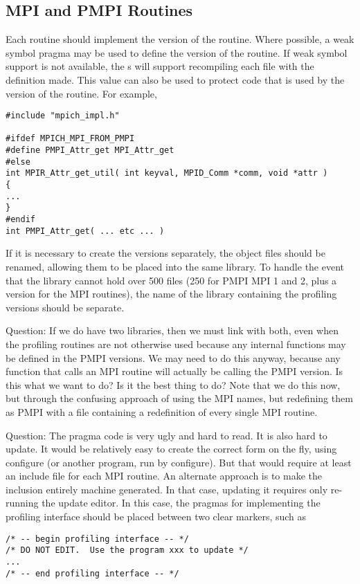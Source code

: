 \documentclass{article}
\begin{document}
\subsection{MPI and PMPI Routines}
Each routine should implement the  version of the routine.
Where possible, a weak symbol pragma may be used to define the
 version of the routine.  If weak symbol support is not
available, the s will support recompiling each file
with the definition  made.  This value
can also be used to protect code that is used by the 
version of the routine.  For example, 
\begin{verbatim}
#include "mpich_impl.h"

#ifdef MPICH_MPI_FROM_PMPI
#define PMPI_Attr_get MPI_Attr_get
#else
int MPIR_Attr_get_util( int keyval, MPID_Comm *comm, void *attr )
{
...
}
#endif
int PMPI_Attr_get( ... etc ... )
\end{verbatim}

If it is necessary to create the  versions separately, the
object files should be renamed, allowing them to be placed into the
same library.  To handle the event that the library cannot hold over
500 files (250 for PMPI MPI 1 and 2, plus a version for the MPI
routines), the name of the library containing the profiling versions
should be separate.

Question: If we do have two libraries, then we must link with both,
even when the profiling routines are not otherwise used because any
internal functions may be defined in the PMPI versions.  We may need
to do this anyway, because any function that calls an MPI routine will
actually be calling the PMPI version.  Is this what we want to do?  Is
it the best thing to do?  Note that we do this now, but through the
confusing approach of using the MPI names, but redefining them as PMPI
with a file containing a redefinition of every single MPI routine.

Question: The pragma code is very ugly and hard to read.  It is also hard to
update.
It would be relatively
easy to create the correct form on the fly, using configure (or
another program, run by configure).  But that
would require at least an include file for each MPI routine.
An alternate approach is to make the inclusion entirely machine
generated.  In that case, updating it requires only re-running the
update editor.  In this case, the pragmas for implementing the
profiling interface should be placed between two clear markers, such
as 
\begin{verbatim}
/* -- begin profiling interface -- */
/* DO NOT EDIT.  Use the program xxx to update */
...
/* -- end profiling interface -- */
\end{verbatim}
\end{document}
